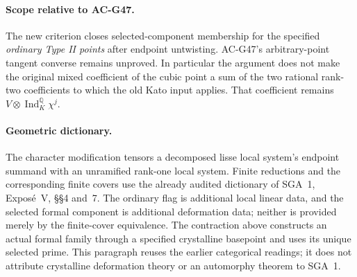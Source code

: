 \paragraph{Scope relative to AC-G47.}
The new criterion closes selected-component membership for
the specified \emph{ordinary Type II points} after endpoint
untwisting.  AC-G47's arbitrary-point tangent converse
remains unproved.  In particular the argument does not make
the original mixed coefficient of the cubic point a sum of
the two rational rank-two coefficients to which the old
Kato input applies.  That coefficient remains
$V\otimes\operatorname{Ind}_K^{\mathbb Q}\chi^j$.


\paragraph{Geometric dictionary.}
The character modification tensors a decomposed lisse local
system's endpoint summand with an unramified rank-one local
system.  Finite reductions and the corresponding finite
covers use the already audited dictionary of SGA~1,
Expos\'e~V, \S\S4 and~7.  The ordinary flag is additional
local linear data, and the selected formal component is
additional deformation data; neither is provided merely
by the finite-cover equivalence.  The contraction above
constructs an actual formal family through a specified
crystalline basepoint and uses its unique selected prime.
This paragraph reuses the earlier categorical readings;
it does not attribute crystalline deformation theory or
an automorphy theorem to SGA~1.
